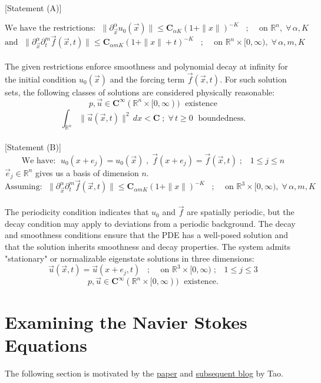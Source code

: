 \documentclass[12pt]{article}
\begin{document}
[Statement (A)]

\[\text{We have the restrictions: }\; \|\partial_{\vec x}^{\alpha} u_{0}(\vec x)\| \le \mathbf{C}_{\alpha K} (1 + \|x\|)^{-K}\;\;\;;\;\;\; \text{ on } \mathbb{R}^{n},\;\forall\, \alpha, K \]
\[\text{and }\; \|\partial_{\vec x}^{\alpha} \partial_{t}^{m} \vec f(\vec x, t)\| \le \mathbf{C}_{\alpha mK} (1+\|x\|+t)^{-K}\;\;\;;\;\;\; \text{ on }\mathbb{R}^{n} \times [0,\infty),\;\forall\, \alpha, m, K\] \\
The given restrictions enforce smoothness and polynomial decay at infinity for the initial condition $u_{0}(\vec x)$ and the forcing term $\vec f(\vec x, t)$. For such solution sets, the following classes of solutions are considered physically reasonable: 
\[ p, \vec u \in \mathbf{C}^{\infty}(\mathbb{R}^{n}\times[0,\infty)) \;\text{ existence}\]
\[\int_{\mathbb{R}^{n}} \|\vec u (\vec x, t)\|^{2} \, dx < \mathbf{C}\;;\;\forall \, t \ge 0 \;\text{ boundedness.}\] \\

[Statement (B)]
\[\text{We have: }\; u_{0} (x + e_{j}) = u_{0} (\vec x) \;,\; \vec f (x + e_{j}) = \vec f (\vec x, t)\;;\;\;\; 1 \le j \le n \]
$\vec e_{j} \in \mathbb{R}^{n}$ gives us a basis of dimension $n$.
\[\text{Assuming: }\; \|\partial_{\vec x}^{\alpha} \partial_{t}^{m} \vec f(\vec x, t)\| \le \mathbf{C}_{\alpha mK} (1+\|x\|)^{-K}\;\;\;;\;\;\; \text{ on }\mathbb{R}^{3} \times [0,\infty),\;\forall\, \alpha, m, K \] \\
The periodicity condition indicates that $u_{0}$ and $\vec f$ are spatially periodic, but the decay condition may apply to deviations from a periodic background. The decay and smoothness conditions ensure that the PDE has a well-posed solution and that the solution inherits smoothness and decay properties. The system admits "stationary" or normalizable eigenstate solutions in three dimensions: 
\[\vec u (\vec x, t) = \vec u (x + e_{j}, t)\;\;\;;\;\;\; \text{ on }\mathbb{R}^{3} \times [0, \infty)\;;\;\;\; 1 \le j \le 3 \]
\[ p, \vec u \in \mathbf{C}^{\infty}(\mathbb{R}^{n}\times[0,\infty)) \;\text{ existence.}\]

\section{Examining the Navier Stokes Equations}
The following section is motivated by the \href{https://arxiv.org/pdf/1402.0290}{paper} and \href{https://terrytao.wordpress.com/2014/02/04/finite-time-blowup-for-an-averaged-three-dimensional-navier-stokes-equation/}{subsequent blog} by Tao. \\
\end{document}
